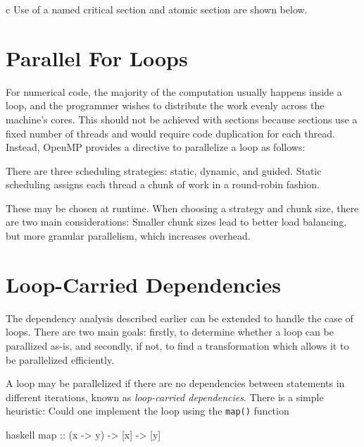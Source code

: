 \documentclass[conference, a4paper]{IEEEtran-modified}
\begin{document}
\begin{ccode}[]{c}
  Use of a named critical section and atomic section are shown below.






\section{Parallel For Loops}

  For numerical code, the majority of the computation usually happens inside a loop, and the programmer wishes to distribute the work evenly across the machine's cores. This should not be achieved with sections because sections use a fixed number of threads and would require code duplication for each thread. Instead, OpenMP provides a directive to parallelize a loop as follows: 

      
  There are three scheduling strategies: static, dynamic, and guided. Static scheduling assigns each thread a chunk of work in a round-robin fashion. 

  These may be chosen at runtime. When choosing a strategy and chunk size, there are two main considerations: Smaller chunk sizes lead to better load balancing, but more granular parallelism, which increases overhead. 


\section{Loop-Carried Dependencies}

  The dependency analysis described earlier can be extended to handle the case of loops. There are two main goals: firstly, to determine whether a loop can be parallized as-is, and secondly, if not, to find a transformation which allows it to be parallelized efficiently.


  A loop may be parallelized if there are no dependencies between statements in different iterations, known as \emph{loop-carried dependencies}. There is a simple heuristic: Could one implement the loop using the \texttt{map()} function

        \begin{ccode}[]
        {haskell}
        map :: (x -> y) -> [x] -> [y]
      \end{ccode}



\end{ccode}
\end{document}
